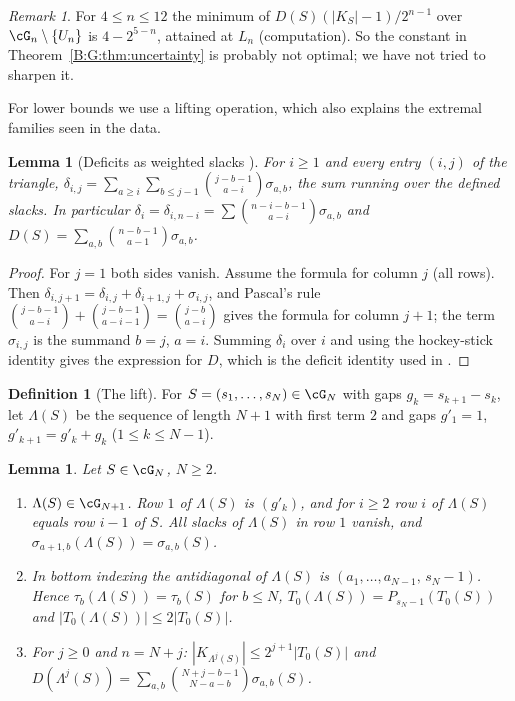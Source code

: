 \documentclass[11pt,a4paper]{article}
\newtheorem{lemma}[theorem]{Lemma}
\theoremstyle{definition}
\newtheorem{definition}[theorem]{Definition}
\theoremstyle{remark}
\newtheorem{remark}[theorem]{Remark}
\numberwithin{equation}{section}
\begin{document}
\begin{remark}\label{B:G:rem:const}
For $4\le n\le12$ the minimum of $D(S)(|K_S|-1)/2^{n-1}$ over $\cG_n\setminus\{U_n\}$ is
$4-2^{5-n}$, attained at $L_n$ (computation). So the constant in Theorem~\ref{B:G:thm:uncertainty}
is probably not optimal; we have not tried to sharpen it.
\end{remark}

For lower bounds we use a lifting operation, which also explains the extremal families seen in
the data.

\begin{lemma}[Deficits as weighted slacks \cite{R021}]\label{B:G:lem:paths}
For $i\ge1$ and every entry $(i,j)$ of the triangle,
$\delta_{i,j}=\sum_{a\ge i}\sum_{b\le j-1}\binom{j-b-1}{a-i}\sigma_{a,b}$, the sum running over
the defined slacks. In particular $\delta_i=\delta_{i,n-i}=\sum\binom{n-i-b-1}{a-i}\sigma_{a,b}$ and
$D(S)=\sum_{a,b}\binom{n-b-1}{a-1}\sigma_{a,b}$.
\end{lemma}

\begin{proof}
For $j=1$ both sides vanish. Assume the formula for column $j$ (all rows). Then
$\delta_{i,j+1}=\delta_{i,j}+\delta_{i+1,j}+\sigma_{i,j}$, and Pascal's rule
$\binom{j-b-1}{a-i}+\binom{j-b-1}{a-i-1}=\binom{j-b}{a-i}$ gives the formula for column $j+1$; the
term $\sigma_{i,j}$ is the summand $b=j$, $a=i$. Summing $\delta_i$ over $i$ and using the
hockey-stick identity gives the expression for $D$, which is the deficit identity used in \cite[Sect.~2.4]{R021}.
\end{proof}

\begin{definition}[The lift]\label{B:G:def:lift}
For $S=(s_1,\dots,s_N)\in\cG_N$ with gaps $g_k=s_{k+1}-s_k$, let $\Lambda(S)$ be the sequence of
length $N+1$ with first term $2$ and gaps $g'_1=1$, $g'_{k+1}=g'_k+g_k$ ($1\le k\le N-1$).
\end{definition}

\begin{lemma}\label{B:G:lem:lift}
Let $S\in\cG_N$, $N\ge2$.
\begin{enumerate}
\item[(a)] $\Lambda(S)\in\cG_{N+1}$. Row $1$ of $\Lambda(S)$ is $(g'_k)$, and for $i\ge2$ row $i$ of
$\Lambda(S)$ equals row $i-1$ of $S$. All slacks of $\Lambda(S)$ in row $1$ vanish, and
$\sigma_{a+1,b}(\Lambda(S))=\sigma_{a,b}(S)$.
\item[(b)] In bottom indexing the antidiagonal of $\Lambda(S)$ is
$(a_1,\dots,a_{N-1},\,s_N-1)$. Hence $\tau_b(\Lambda(S))=\tau_b(S)$ for $b\le N$,
$T_0(\Lambda(S))=P_{s_N-1}(T_0(S))$ and $|T_0(\Lambda(S))|\le2|T_0(S)|$.
\item[(c)] For $j\ge0$ and $n=N+j$: $|K_{\Lambda^j(S)}|\le2^{j+1}|T_0(S)|$ and
$D(\Lambda^j(S))=\sum_{a,b}\binom{N+j-b-1}{N-a-b}\sigma_{a,b}(S)$.
\end{enumerate}
\end{lemma}
\end{document}
